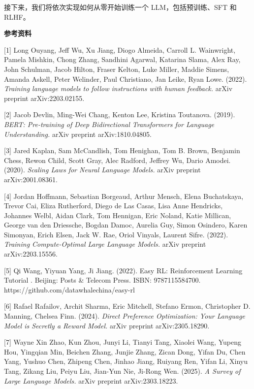 \documentclass[
]{article}
\begin{document}
接下来，我们将依次实现如何从零开始训练一个 LLM，包括预训练、SFT 和
RLHF。

\textbf{参考资料}

{[}1{]} Long Ouyang, Jeff Wu, Xu Jiang, Diogo Almeida, Carroll L.
Wainwright, Pamela Mishkin, Chong Zhang, Sandhini Agarwal, Katarina
Slama, Alex Ray, John Schulman, Jacob Hilton, Fraser Kelton, Luke
Miller, Maddie Simens, Amanda Askell, Peter Welinder, Paul Christiano,
Jan Leike, Ryan Lowe. (2022). \emph{Training language models to follow
instructions with human feedback.} arXiv preprint arXiv:2203.02155.

{[}2{]} Jacob Devlin, Ming-Wei Chang, Kenton Lee, Kristina Toutanova.
(2019). \emph{BERT: Pre-training of Deep Bidirectional Transformers for
Language Understanding.} arXiv preprint arXiv:1810.04805.

{[}3{]} Jared Kaplan, Sam McCandlish, Tom Henighan, Tom B. Brown,
Benjamin Chess, Rewon Child, Scott Gray, Alec Radford, Jeffrey Wu, Dario
Amodei. (2020). \emph{Scaling Laws for Neural Language Models.} arXiv
preprint arXiv:2001.08361.

{[}4{]} Jordan Hoffmann, Sebastian Borgeaud, Arthur Mensch, Elena
Buchatskaya, Trevor Cai, Eliza Rutherford, Diego de Las Casas, Lisa Anne
Hendricks, Johannes Welbl, Aidan Clark, Tom Hennigan, Eric Noland, Katie
Millican, George van den Driessche, Bogdan Damoc, Aurelia Guy, Simon
Osindero, Karen Simonyan, Erich Elsen, Jack W. Rae, Oriol Vinyals,
Laurent Sifre. (2022). \emph{Training Compute-Optimal Large Language
Models.} arXiv preprint arXiv:2203.15556.

{[}5{]} Qi Wang, Yiyuan Yang, Ji Jiang. (2022). Easy RL: Reinforcement
Learning Tutorial . Beijing: Posts \& Telecom Press. ISBN:
9787115584700. https://github.com/datawhalechina/easy-rl

{[}6{]} Rafael Rafailov, Archit Sharma, Eric Mitchell, Stefano Ermon,
Christopher D. Manning, Chelsea Finn. (2024). \emph{Direct Preference
Optimization: Your Language Model is Secretly a Reward Model.} arXiv
preprint arXiv:2305.18290.

{[}7{]} Wayne Xin Zhao, Kun Zhou, Junyi Li, Tianyi Tang, Xiaolei Wang,
Yupeng Hou, Yingqian Min, Beichen Zhang, Junjie Zhang, Zican Dong, Yifan
Du, Chen Yang, Yushuo Chen, Zhipeng Chen, Jinhao Jiang, Ruiyang Ren,
Yifan Li, Xinyu Tang, Zikang Liu, Peiyu Liu, Jian-Yun Nie, Ji-Rong Wen.
(2025). \emph{A Survey of Large Language Models.} arXiv preprint
arXiv:2303.18223.
\end{document}

